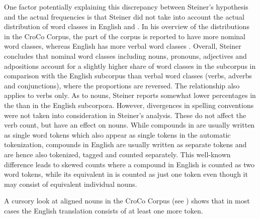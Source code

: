 \documentclass[output=paper]{LSP/langsci}
\begin{document}
One factor potentially explaining this discrepancy between Steiner's hypothesis and the actual frequencies is that Steiner did not take into account the actual distribution of word classes in English and . In his overview of the distributions in the CroCo Corpus, the  part of the corpus is reported to have more nominal word classes, whereas English has more verbal word classes \citep[80]{Steiner2012}. Overall, Steiner concludes that nominal word classes including nouns, pronouns, adjectives and adpositions account for a slightly higher share of word classes in the  subcorpus in comparison with the English subcorpus than verbal word classes (verbs, adverbs and conjunctions), where the proportions are reversed. The relationship also applies to verbs only. As to nouns, Steiner reports somewhat lower percentages in the  than in the English subcorpora. However, divergences in spelling conventions were not taken into consideration in Steiner's analysis. These do not affect the verb count, but have an effect on nouns. While compounds in  are usually written as single word tokens which also appear as single tokens in the automatic tokenization, compounds in English are usually written as separate tokens and are hence also tokenized, tagged and counted separately. This well-known difference leads to skewed counts where a compound in English is counted as two word tokens, while its equivalent in  is counted as just one token even though it may consist of equivalent individual nouns. 

A cursory look at aligned nouns in the CroCo Corpus (see ) shows that in most cases the English translation consists of at least one more token.

\begin{table} %
  	\caption{Equivalents of German compounds from the CroCo Corpus}
  	\label{serbinaetal:tab:1}
\end{table}
\end{document}

